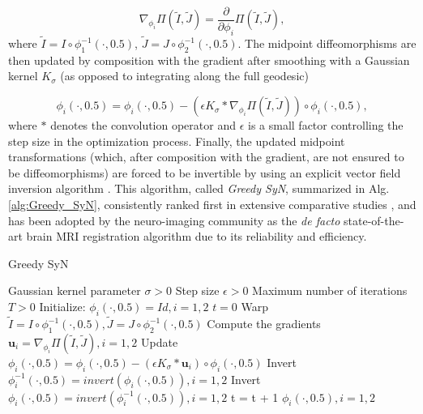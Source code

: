 \begin{equation}\label{eq:grad_metric}
    \nabla_{\phi_{i}} \Pi(\tilde{I}, \tilde{J}) = \frac{\partial}{\partial \phi_{i}} \Pi \left( \tilde{I}, \tilde{J}\right),
\end{equation}
where $\tilde{I} = I \circ \phi_{1}^{-1}(\cdot, 0.5)$, $\tilde{J} = J \circ \phi_{2}^{-1}(\cdot, 0.5)$. The midpoint diffeomorphisms are then updated by composition with the gradient after smoothing with a Gaussian kernel $K_{\sigma}$ (as opposed to integrating along the full geodesic)

\begin{equation}\label{eq:gsyn_update}
    \phi_{i}(\cdot, 0.5) = \phi_{i}(\cdot, 0.5) - \left( \epsilon K_{\sigma} \ast \nabla_{\phi_{i}} \Pi(\tilde{I}, \tilde{J}) \right) \circ \phi_{i}(\cdot, 0.5),
\end{equation}
where $\ast$ denotes the convolution operator and $\epsilon$ is a small factor controlling the step size in the optimization process. Finally, the updated midpoint transformations (which, after composition with the gradient, are not ensured to be diffeomorphisms) are forced to be invertible by using an
explicit vector field inversion algorithm \cite{Chen2008}. This algorithm, called \textit{Greedy SyN}, summarized in Alg. \eqref{alg:Greedy_SyN}, consistently ranked first in extensive comparative
studies \cite{Klein2009}\cite{Klein2010}\cite{Rohlfing2012}, and has been adopted by the neuro-imaging community as the \textit{de facto} state-of-the-art brain
MRI registration algorithm due to its reliability and efficiency.

\begin{algorithm}[h!]
\caption{Greedy SyN}\label{alg:Greedy_SyN}
\begin{algorithmic}[1]
\REQUIRE Gaussian kernel parameter $\sigma>0$
\REQUIRE Step size $\epsilon>0$
\REQUIRE Maximum number of iterations $T>0$
\STATE Initialize: $\phi_{i}(\cdot, 0.5) = Id, i=1, 2$
\STATE $t=0$
\REPEAT
    \STATE Warp $\tilde{I}  = I \circ \phi_{1}^{-1}(\cdot, 0.5), \tilde{J} = J \circ \phi_{2}^{-1}(\cdot, 0.5)$
    \STATE Compute the gradients $\mathbf{u}_{i} = \nabla_{\phi_{i}} \Pi(\tilde{I}, \tilde{J}), i=1,2$
    \STATE Update $\phi_{i}(\cdot, 0.5) = \phi_{i}(\cdot, 0.5) - \left( \epsilon K_{\sigma} \ast \mathbf{u}_{i} \right) \circ \phi_{i}(\cdot, 0.5)$
    \STATE Invert $\phi_{i}^{-1}(\cdot, 0.5) = invert (\phi_{i}(\cdot, 0.5)), i=1, 2$
    \STATE Invert $\phi_{i}(\cdot, 0.5) = invert (\phi_{i}^{-1}(\cdot, 0.5)), i=1, 2$
    \STATE t = t + 1
\RETURN $\phi_{i}(\cdot, 0.5), i=1,2$
\end{algorithmic}
\end{algorithm}

